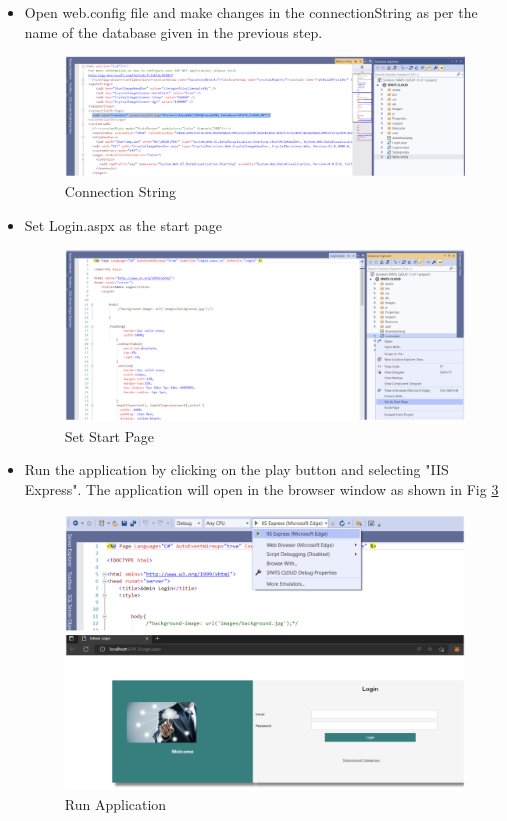 \documentclass[10pt]{article}
\begin{document}
\begin{itemize}
\item Open web.config file and make changes in the connectionString as per the name of the database given in the previous step. 
\begin{figure}[H]
    \begin{center}
        \includegraphics[width=0.7\linewidth, frame]{CA2-template/CM15.png}
       \caption{Connection String \label{fig:7}}
    \end{center}
\end{figure}

\item Set Login.aspx as the start page
\begin{figure}[H]
    \begin{center}
        \includegraphics[width=0.7\linewidth, frame]{CA2-template/CM16.png}
       \caption{Set Start Page \label{fig:8}}
    \end{center}
\end{figure}

\item Run the application by clicking on the play button and selecting "IIS Express". The application will open in the browser window as shown in Fig \ref{fig:9}
\begin{figure}[H]
    \begin{center}
        \includegraphics[width=0.7\linewidth, frame]{CA2-template/CM17.png}
       \caption{Run Application \label{fig:9}}
    \end{center}
\end{figure}

\end{itemize}
\end{document}
